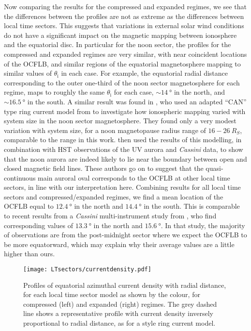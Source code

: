 Now comparing the results for the compressed and expanded regimes, we see that the differences between the profiles are not as extreme as the differences between local time sectors. This suggests that variations in external solar wind conditions do not have a significant impact on the magnetic mapping between ionosphere and the equatorial disc. In particular for the noon sector, the profiles for the compressed and expanded regimes are very similar, with near coincident locations of the OCFLB, and similar regions of the equatorial magnetosphere mapping to similar values of $\theta_\mathrm{i}$ in each case. For example, the equatorial radial distance corresponding to the outer one-third of the noon sector magnetosphere for each regime, maps to roughly the same $\theta_\mathrm{i}$ for each case, ${\sim}\SI{14}{\degree}$ in the north, and ${\sim}\SI{16.5}{\degree}$ in the south. A similar result was found in \citet{bunce2008}, who used an adapted ``CAN'' type \citep{connerney1981b,connerney1983} ring current model from \citet{bunce2007} to investigate how ionospheric mapping varied with system size in the noon sector magnetosphere. They found only a very modest variation with system size, for a noon magnetopause radius range of $16-\SI{26}{R_S}$, comparable to the range in this work. \citet{bunce2008b} then used the results of this modelling, in combination with HST observations of the UV aurora and \textit{Cassini} data, to show that the noon aurora are indeed likely to lie near the boundary between open and closed magnetic field lines. These authors go on to suggest that the quasi-continuous main auroral oval corresponds to the OCFLB at other local time sectors, in line with our interpretation here. Combining results for all local time sectors and compressed/expanded regimes, we find a mean location of the OCFLB equal to $\SI{12.4}{\degree}$ in the north and $\SI{14.4}{\degree}$ in the south. This is comparable to recent results from a \textit{Cassini} multi-instrument study from \citet{jinks2014}, who find corresponding values of $\SI{13.3}{\degree}$ in the north and $\SI{15.6}{\degree}$. In that study, the majority of observations are from the post-midnight sector where we expect the OCFLB to be more equatorward, which may explain why their average values are a little higher than ours.

\begin{figure}
\centering
\texttt{[image: LTsectors/currentdensity.pdf]}
\caption[Model equatorial profiles of azimuthal current density for different local time sectors, for compressed and expanded regimes.]{Profiles of equatorial azimuthal current density with radial distance, for each local time sector model as shown by the colour, for compressed (left) and expanded (right) regimes. The grey dashed line shows a representative profile with current density inversely proportional to radial distance, as for a \citet{connerney1981b, connerney1983} style ring current model.}
\label{LTsectors:fig:currentdensity}
\end{figure}

